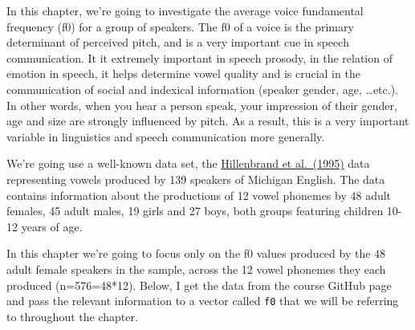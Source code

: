\documentclass[
]{book}
\newenvironment{Shaded}{\begin{snugshade}}{\end{snugshade}}
\newcommand{\CommentTok}[1]{\textcolor[rgb]{0.56,0.35,0.01}{\textit{#1}}}
\newcommand{\FunctionTok}[1]{\textcolor[rgb]{0.00,0.00,0.00}{#1}}
\newcommand{\NormalTok}[1]{#1}
\newcommand{\OtherTok}[1]{\textcolor[rgb]{0.56,0.35,0.01}{#1}}
\newcommand{\SpecialCharTok}[1]{\textcolor[rgb]{0.00,0.00,0.00}{#1}}
\newcommand{\StringTok}[1]{\textcolor[rgb]{0.31,0.60,0.02}{#1}}
\begin{document}
In this chapter, we're going to investigate the average voice fundamental frequency (f0) for a group of speakers. The f0 of a voice is the primary determinant of perceived pitch, and is a very important cue in speech communication. It it extremely important in speech prosody, in the relation of emotion in speech, it helps determine vowel quality and is crucial in the communication of social and indexical information (speaker gender, age, \ldots etc.). In other words, when you hear a person speak, your impression of their gender, age and size are strongly influenced by pitch. As a result, this is a very important variable in linguistics and speech communication more generally.

We're going use a well-known data set, the \href{https://homepages.wmich.edu/~hillenbr/Papers/HillenbrandGettyClarkWheeler.pdf}{Hillenbrand et al.~(1995)} data representing vowels produced by 139 speakers of Michigan English. The data contains information about the productions of 12 vowel phonemes by 48 adult females, 45 adult males, 19 girls and 27 boys, both groups featuring children 10-12 years of age.

In this chapter we're going to focus only on the f0 values produced by the 48 adult female speakers in the sample, across the 12 vowel phonemes they each produced (n=576=48*12). Below, I get the data from the course GitHub page and pass the relevant information to a vector called \texttt{f0} that we will be referring to throughout the chapter.

\begin{Shaded}
\end{Shaded}
\end{document}
